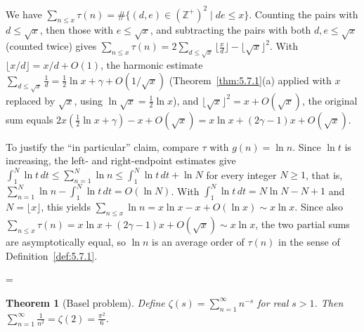 \documentclass[11pt]{article}
\makeatletter
\theoremstyle{ntstyle}
\newtheorem{theorem}{Theorem}[subsection]
\let\nt@closedisplay\]
\def\nt@guardedclose{\@ifnextchar\par{\nt@closeafterpar}{\@ifnextchar\end{\postdisplaypenalty\@M\nt@closedisplay}{\nt@closedisplay}}}
\def\nt@closeafterpar\par{\@ifnextchar\par{\nt@closeafterpar}{\@ifnextchar\end{\postdisplaypenalty\@M\nt@closedisplay\par}{\nt@closedisplay\par}}}
\renewenvironment{proof}[1][\proofname]{\par
  \pushQED{\qed}\normalfont\topsep\medskipamount\edef\nt@afterproof{\@endparpenalty=\the\@endparpenalty\relax}\@beginparpenalty\@M\@endparpenalty\@M\let\]\nt@guardedclose\trivlist\item[]\textit{#1\@addpunct{.}} \ignorespaces}{\ifvmode\addpenalty\@M\fi\popQED\nt@afterproof\endtrivlist\@endpefalse}
\makeatother
\begin{document}
\begin{proof} We have $\sum_{n\le
			x}\tau(n)=\#\{(d,e)\in(\mathbb{Z}^+)^2 \mid de\le x\}$. Counting the
	pairs with $d\le\sqrt{x}$, then those with $e\le\sqrt{x}$, and
	subtracting the pairs with both $d,e\le\sqrt{x}$ (counted twice) gives
	$\sum_{n\le x}\tau(n)=2\sum_{d\le\sqrt{x}}\big\lfloor\tfrac{x}{d}\big\rfloor-\lfloor\sqrt{x}\rfloor^2$. With $\lfloor
		x/d\rfloor=x/d+O(1)$, the harmonic estimate $\sum_{d\le\sqrt{x}}\tfrac{1}{d}=\tfrac{1}{2}\ln x+\gamma+O(1/\sqrt{x})$ (Theorem~\ref{thm:5.7.1}(a) applied with $x$ replaced by $\sqrt{x}$, using $\ln\sqrt{x}=\tfrac12\ln x$), and $\lfloor\sqrt
		{x}\rfloor^2=x+O(\sqrt{x})$, the original sum equals $2x(\tfrac{1}{2}\ln
		x+\gamma)-x+O(\sqrt{x})=x\ln x+(2\gamma-1)x+O(\sqrt{x})$.

	To justify the ``in particular'' claim, compare $\tau$ with $g(n)=\ln n$. Since $\ln t$ is increasing, the left- and right-endpoint estimates give $\int_1^{N}\ln t\,dt\le\sum_{n=1}^{N}\ln n\le\int_1^{N}\ln t\,dt+\ln N$ for every integer $N\ge1$, that is, $\sum_{n=1}^{N}\ln n-\int_1^{N}\ln t\,dt=O(\ln N)$. With $\int_1^{N}\ln t\,dt=N\ln N-N+1$ and $N=\lfloor x\rfloor$, this yields $\sum_{n\le x}\ln n=x\ln x-x+O(\ln x)\sim x\ln x$. Since also $\sum_{n\le x}\tau(n)=x\ln x+(2\gamma-1)x+O(\sqrt{x})\sim x\ln x$, the two partial sums are asymptotically equal, so $\ln n$ is an average order of $\tau(n)$ in the sense of Definition~\ref{def:5.7.1}.

\end{proof}
\begin{theorem}[Basel problem]\label{thm:5.7.3} Define $\zeta(s)=\sum_{n=1}^{\infty}n^{-s}$ for real $s>1$. Then
	$\sum_{n=1}^{\infty}\frac{1}{n^2}=\zeta(2)=\frac{\pi^2}{6}$.

\end{theorem}
\end{document}
